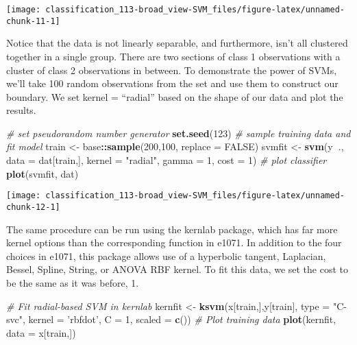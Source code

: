 \documentclass[]{book}
\newenvironment{Shaded}{\begin{snugshade}}{\end{snugshade}}
\newcommand{\CommentTok}[1]{\textcolor[rgb]{0.56,0.35,0.01}{\textit{#1}}}
\newcommand{\DataTypeTok}[1]{\textcolor[rgb]{0.13,0.29,0.53}{#1}}
\newcommand{\DecValTok}[1]{\textcolor[rgb]{0.00,0.00,0.81}{#1}}
\newcommand{\KeywordTok}[1]{\textcolor[rgb]{0.13,0.29,0.53}{\textbf{#1}}}
\newcommand{\NormalTok}[1]{#1}
\newcommand{\OperatorTok}[1]{\textcolor[rgb]{0.81,0.36,0.00}{\textbf{#1}}}
\newcommand{\OtherTok}[1]{\textcolor[rgb]{0.56,0.35,0.01}{#1}}
\newcommand{\StringTok}[1]{\textcolor[rgb]{0.31,0.60,0.02}{#1}}
\begin{document}
\begin{center}\texttt{[image: classification\_113-broad\_view-SVM\_files/figure-latex/unnamed-chunk-11-1]} \end{center}

Notice that the data is not linearly separable, and furthermore, isn't all clustered together in a single group. There are two sections of class 1 observations with a cluster of class 2 observations in between. To demonstrate the power of SVMs, we'll take 100 random observations from the set and use them to construct our boundary. We set kernel = ``radial'' based on the shape of our data and plot the results.

\begin{Shaded}
\begin{Highlighting}[]
\CommentTok{# set pseudorandom number generator}
\KeywordTok{set.seed}\NormalTok{(}\DecValTok{123}\NormalTok{)}
\CommentTok{# sample training data and fit model}
\NormalTok{train <-}\StringTok{ }\NormalTok{base}\OperatorTok{::}\KeywordTok{sample}\NormalTok{(}\DecValTok{200}\NormalTok{,}\DecValTok{100}\NormalTok{, }\DataTypeTok{replace =} \OtherTok{FALSE}\NormalTok{)}
\NormalTok{svmfit <-}\StringTok{ }\KeywordTok{svm}\NormalTok{(y}\OperatorTok{~}\NormalTok{., }\DataTypeTok{data =}\NormalTok{ dat[train,], }\DataTypeTok{kernel =} \StringTok{"radial"}\NormalTok{, }\DataTypeTok{gamma =} \DecValTok{1}\NormalTok{, }\DataTypeTok{cost =} \DecValTok{1}\NormalTok{)}
\CommentTok{# plot classifier}
\KeywordTok{plot}\NormalTok{(svmfit, dat)}
\end{Highlighting}
\end{Shaded}

\begin{center}\texttt{[image: classification\_113-broad\_view-SVM\_files/figure-latex/unnamed-chunk-12-1]} \end{center}

The same procedure can be run using the kernlab package, which has far more kernel options than the corresponding function in e1071. In addition to the four choices in e1071, this package allows use of a hyperbolic tangent, Laplacian, Bessel, Spline, String, or ANOVA RBF kernel. To fit this data, we set the cost to be the same as it was before, 1.

\begin{Shaded}
\begin{Highlighting}[]
\CommentTok{# Fit radial-based SVM in kernlab}
\NormalTok{kernfit <-}\StringTok{ }\KeywordTok{ksvm}\NormalTok{(x[train,],y[train], }\DataTypeTok{type =} \StringTok{"C-svc"}\NormalTok{, }\DataTypeTok{kernel =} \StringTok{'rbfdot'}\NormalTok{, }\DataTypeTok{C =} \DecValTok{1}\NormalTok{, }\DataTypeTok{scaled =} \KeywordTok{c}\NormalTok{())}
\CommentTok{# Plot training data}
\KeywordTok{plot}\NormalTok{(kernfit, }\DataTypeTok{data =}\NormalTok{ x[train,])}
\end{Highlighting}
\end{Shaded}
\end{document}
